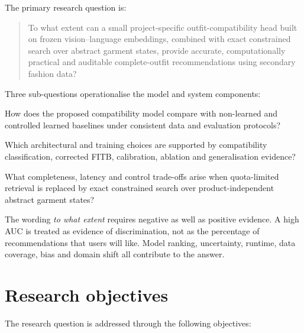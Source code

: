 The primary research question is:

\begin{quote}
To what extent can a small project-specific outfit-compatibility head built on frozen
vision--language embeddings, combined with exact constrained search over
abstract garment states, provide accurate, computationally practical and
auditable complete-outfit recommendations using secondary fashion data?
\end{quote}

Three sub-questions operationalise the model and system components:

\begin{description}[style=nextline,leftmargin=1.2cm,labelindent=0cm]
  \item[\textbf{RQ1.}] How does the proposed compatibility model compare with
        non-learned and controlled learned baselines under consistent data and
        evaluation protocols?
  \item[\textbf{RQ2.}] Which architectural and training choices are supported
        by compatibility classification, corrected FITB, calibration,
        ablation and generalisation evidence?
  \item[\textbf{RQ3.}] What completeness, latency and control trade-offs arise
        when quota-limited retrieval is replaced by exact constrained search
        over product-independent abstract garment states?
\end{description}

The wording \emph{to what extent} requires negative as well as positive
evidence. A high AUC is treated as evidence of discrimination, not as the
percentage of recommendations that users will like. Model ranking, uncertainty,
runtime, data coverage, bias and domain shift all contribute to the
answer.

\section{Research objectives}

The research question is addressed through the following objectives:

